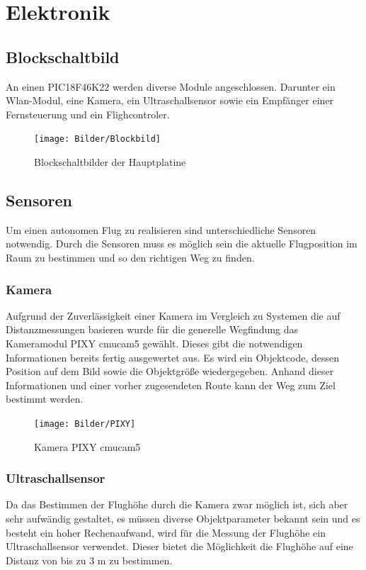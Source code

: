 \chapter{Elektronik}

\renewcommand{\kapitelautor}{Autor: Lucas Ullrich}

\section{Blockschaltbild}
An einen PIC18F46K22 werden diverse Module angeschlossen. Darunter ein Wlan-Modul, eine Kamera, ein Ultraschallsensor sowie ein Empfänger einer Fernsteuerung und ein Flighcontroler.
\begin{figure}[H]
\begin{centering}
\texttt{[image: Bilder/Blockbild]}
\par\end{centering}
\caption{Blockschaltbilder der Hauptplatine}
\label{Blockschaltbild}
\end{figure}

\section{Sensoren}
Um einen autonomen Flug zu realisieren sind unterschiedliche Sensoren notwendig.
Durch die Sensoren muss es möglich sein die aktuelle Flugposition im Raum zu bestimmen und so den richtigen Weg zu finden.

\subsection{Kamera}
Aufgrund der Zuverlässigkeit einer Kamera im Vergleich zu Systemen die auf Distanzmessungen basieren wurde für die generelle Wegfindung das Kameramodul PIXY cmucam5 gewählt. Dieses gibt die notwendigen Informationen bereits fertig ausgewertet aus. Es wird ein Objektcode, dessen Position auf dem Bild sowie die Objektgröße wiedergegeben.
Anhand dieser Informationen und einer vorher zugesendeten Route kann der Weg zum Ziel bestimmt werden.

\begin{figure}[tbh]
\begin{centering}
\texttt{[image: Bilder/PIXY]}
\par\end{centering}
\caption{Kamera PIXY cmucam5}
\label{PIXY}
\end{figure}

\subsection{Ultraschallsensor}
Da das Bestimmen der Flughöhe durch die Kamera zwar möglich ist, sich aber sehr aufwändig gestaltet, es müssen diverse Objektparameter bekannt sein und es besteht ein hoher Rechenaufwand, wird für die Messung der Flughöhe ein Ultraschallsensor verwendet. Dieser bietet die Möglichkeit die Flughöhe auf eine Distanz von bis zu 3 m zu bestimmen.

